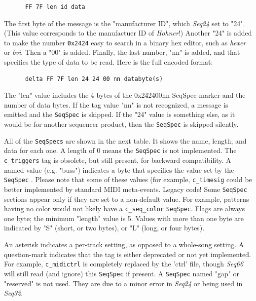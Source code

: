    \begin{verbatim}
      FF 7F len id data
   \end{verbatim}

   The first byte of the message is the "manufacturer ID",
   which \textsl{Seq24} set to "24".
   (This value corresponds to the manufactuer ID of \textsl{Hohner}!)
   Another "24" is added to make the number \texttt{0x2424}
   easy to search in a binary hex editor, such as \textsl{hexer} or
   \textsl{bvi}.
   Then a "00" is added.  Finally, the last number, "nn" is added, and that
   specifies the type of data to be read.  Here is the full encoded
   format:

   \begin{verbatim}
      delta FF 7F len 24 24 00 nn databyte(s)
   \end{verbatim}

   The "len" value includes the 4 bytes of the 0x242400nn
   SeqSpec marker and the number of data bytes.
   If the tag value "nn" is not recognized, a message is emitted and the
   \texttt{SeqSpec} is skipped.  If the "24" value is something else, as it
   would be for another sequencer product, then the
   \texttt{SeqSpec} is skipped silently.

   All of the
   \texttt{SeqSpecs} are shown in the next table. It shows the name, length,
   and data for each one. A length of 0 means the
   \texttt{SeqSpec} is not implemented.
   The \texttt{c\_triggers} tag is obsolete, but still present, for
   backward compatibility.
   A named value (e.g. "buss") indicates a byte that specifies the value set by
   the \texttt{SeqSpec} .
   Please note that some of these values (for example, \texttt{c\_timesig}
   could be better implemented by standard MIDI meta-events. Legacy code!
   Some \texttt{SeqSpec} sections appear only if they are set to a non-default
   value.
   For example, patterns having no color would not likely have a
   \texttt{c\_seq\_color} \texttt{SeqSpec}.
   Flags are always one byte; the minimum "length" value is 5.
   Values with more than one byte are indicated by "S" (short, or two bytes),
   or "L" (long, or four bytes).

   An asterisk indicates a per-track setting, as
   opposed to a whole-song setting. A question-mark indicates that the tag is
   either deprecated or not yet implemented.
   For example, \texttt{c\_midictrl} is completely replaced by the
   'ctrl' file, though \textsl{Seq66} will still read (and ignore)
   this \texttt{SeqSpec} if present.
   A \texttt{SeqSpec} named "gap" or "reserved" is not used.
   They are due to a minor error in \textsl{Seq24} or
   being used in \textsl{Seq32}.

